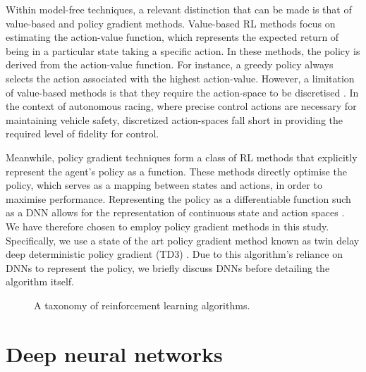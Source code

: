 Within model-free techniques, a relevant distinction that can be made is that of value-based and policy gradient methods.
Value-based RL methods  focus on estimating the action-value function, which represents the expected return of being in a particular state taking a specific action.
In these methods, the policy is derived from the action-value function.
For instance, a greedy policy always selects the action associated with the highest action-value.
However, a limitation of value-based methods is that they require the action-space to be discretised \cite{sutton2020}.
In the context of autonomous racing, where precise control actions are necessary for maintaining vehicle safety, discretized action-spaces fall short in providing the required level of fidelity for control.

Meanwhile, policy gradient techniques form a class of RL methods that explicitly represent the agent's policy as a function.
These methods directly optimise the policy, which serves as a mapping between states and actions, in order to maximise performance.
Representing the policy as a differentiable function such as a DNN allows for the representation of continuous state and action spaces \cite{silver2014}.
We have therefore chosen to employ policy gradient methods in this study.
Specifically, we use a state of the art policy gradient method known as twin delay deep deterministic policy gradient (TD3) \cite{Fujimoto2018}.
Due to this algorithm's reliance on DNNs to represent the policy, we briefly discuss DNNs before detailing the algorithm itself.


\begin{figure}[htb!]
    \centering
    
    \caption[A taxonomy of reinforcement learning algorithms]{A taxonomy of reinforcement learning algorithms.}
    \label{fig:RL:taxonomy}
\end{figure}











\section{Deep neural networks}\label{sec:dnns}


